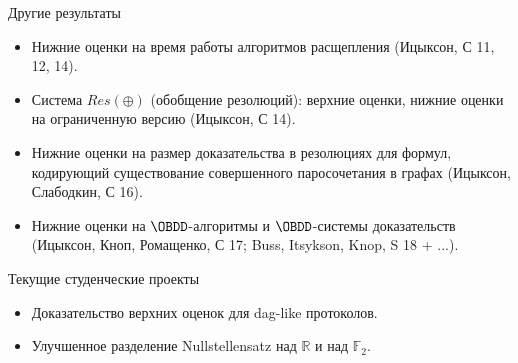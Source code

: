 \begin{frame}{Другие результаты}

    \begin{itemize}
        \item Нижние оценки на время работы алгоритмов расщепления (Ицыксон, С 11, 12, 14).
        \pause
        \item Система $Res(\oplus)$ (обобщение резолюций): верхние оценки, нижние оценки на ограниченную версию (Ицыксон,
            С 14).
        \pause
        \item Нижние оценки на размер доказательства в резолюциях для формул, кодирующий существование совершенного
            паросочетания в графах (Ицыксон, Слабодкин, С 16).
        \pause
        \item Нижние оценки на $\OBDD$-алгоритмы и $\OBDD$-системы доказательств (Ицыксон, Кноп,
            Ромащенко, С 17; Buss, Itsykson, Knop, S 18 + ...).
    \end{itemize}

\end{frame}


\begin{frame}{Текущие студенческие проекты}

    \begin{itemize}
        \item Доказательство верхних оценок для dag-like протоколов.
        \pause
        \item Улучшенное разделение Nullstellensatz над $\mathbb{R}$ и над $\mathbb{F}_2$.
    \end{itemize}
\end{frame}
